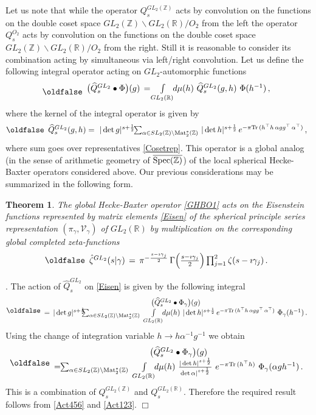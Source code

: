 \documentclass[12pt]{article}
\def\IR{\mathbb{R}}
\def\IZ{\mathbb{Z}}
\def\CV {\mathcal{V}}
\def\a {{\alpha}}
\def\wh{\widehat}
\def\Tr{{\rm Tr}\,}
\newtheorem{te}{Theorem}[section]%
\newcommand{\proof}{\noindent {\it Proof}. }
\def\be{\begin{eqnarray}\new\begin{array}{cc}}
\def\ee{\end{array}\end{eqnarray}}
\newcounter{pac}[section]
\begin{document}
Let us note that while the operator $Q_s^{GL_2(\IZ)}$ acts by
convolution on the functions on the double coset space
$GL_2(\IZ)\backslash GL_2(\IR)/O_2$ from the left the operator
$Q_s^{O_2}$ acts by convolution on the functions on the double coset space
$GL_2(\IZ)\backslash GL_2(\IR)/O_2$ from  the right. Still it is
reasonable to consider its combination acting by simultaneous via
left/right convolution. Let us  define  the following
integral operator acting on $GL_2$-automorphic functions
 \be\label{GHBO1}
  \bigl(\wh{Q}^{GL_2}_s \bullet  \Phi\bigr)(g)\,
  =\!\int\limits_{GL_2(\IR)}\!\!d\mu(h)\,\,\wh{Q}^{GL_2}_s(g,h)\,\,\Phi(h^{-1})\,,
 \ee
where the kernel of the integral operator is given by
 \be\label{GHBO}
  \wh{Q}^{GL_2}_s(g,h)=\,\,|\det g|^{s+\frac{1}{2}}\!\!
  \sum_{\a\in SL_2(\IZ)\backslash {\rm Mat}^*_2(\IZ)}\,|\det h|^{s+\frac{1}{2}} \,
  e^{-\pi\Tr(h^{\top}h
  \,\alpha gg^{\top}\,\alpha^{\top})}\,,
 \ee
where sum goes over representatives \eqref{Cosetrep}.
This operator is a global analog  (in the sense of arithmetic geometry
of $\overline{{\rm Spec}(\IZ)}$) of the local
 spherical Hecke-Baxter  operators considered above. Our previous
 considerations may be summarized in the following form.

\begin{te}\label{TH1}  The global Hecke-Baxter operator \eqref{GHBO1}
  acts on the Eisenstein functions represented by matrix elements
\eqref{Eisen} of the spherical principle series representation
$(\pi_\gamma,\CV_\gamma)$ of $GL_2(\IR)$
by multiplication on the corresponding global completed zeta-functions
 \be\label{GlobalL}
  \hat{\zeta}^{GL_2}(s|\gamma)\,
  =\,\pi^{-\frac{s-\imath \gamma_j}{2}}\,
  \Gamma\Big(\frac{s-\imath \gamma_j}{2}\Big)
  \prod_{j=1}^2 \zeta(s-\imath \gamma_j)
  \,.
 \ee
\end{te}

\proof The action of $\wh{Q}^{GL_2}_s$ on \eqref{Eisen} is given by
the following integral
 \be\nonumber
  \bigl(\wh{Q}^{GL_2}_s \bullet  \Phi_\gamma\bigr)(g)\\
  =\,|\det g|^{s+\frac{1}{2}}\!\!\!\!
  \sum_{\a\in SL_2(\IZ)\backslash {\rm Mat}^*_2(\IZ)}\,\,
  \int\limits_{GL_2(\IR)}\!\!
  d\mu(h)\,\,|\det h|^{s+\frac{1}{2}} \,
  e^{-\pi\Tr(h^{\top}h\,\alpha gg^{\top}\,\alpha^{\top})} \,\,
  \Phi_\gamma(h^{-1})\,.
 \ee
Using the change of integration variable $h\to h\alpha^{-1}g^{-1}$
we obtain
 \be
  \bigl(\wh{Q}^{GL_2}_s \bullet  \Phi_\gamma\bigr)(g)\\
  =\!\!\sum_{\a\in SL_2(\IZ)\backslash {\rm
    Mat}^*_2(\IZ)}\,\,\int\limits_{GL_2(\IR)}\!\!d\mu(h)\,\,
  \frac{|\det h|^{s+\frac{1}{2}}}{\det \alpha|^{s+\frac{1}{2}}}\,\,
  e^{-\pi\Tr(h^{\top}h)}\,\,\Phi_\gamma(\alpha g h^{-1})\,.
 \ee
This is  a combination of
$Q_s^{GL_2(\IZ)}$ and $Q_s^{GL_2(\IR)}$.  Therefore the required result
follows from \eqref{Act456} and \eqref{Act123}. $\Box$
\end{document}
